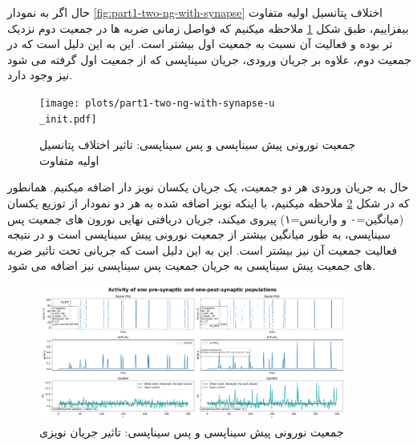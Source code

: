         حال اگر به نمودار 
        \ref{fig:part1-two-ng-with-synapse}
        اختلاف پتانسیل اولیه متفاوت بیفزاییم، طبق شکل 
        \ref{fig:part1-two-ng-with-synapse-u-init}
        ملاحظه میکنیم که فواصل زمانی ضربه ها در جمعیت دوم نزدیک تر بوده و فعالیت آن نسبت به جمعیت اول بیشتر است. این به این دلیل است که در جمعیت دوم، علاوه بر جریان ورودی، جریان سیناپسی که از جمعیت اول گرفته می شود نیز وجود دارد.
        \begin{figure}[!ht]
            \centering
            \texttt{[image: plots/part1-two-ng-with-synapse-u\\\_init.pdf]} 
            \caption{جمعیت نورونی پیش سیناپسی و پس سیناپسی: تاثیر اختلاف پتانسیل اولیه متفاوت}
            \label{fig:part1-two-ng-with-synapse-u-init}
        \end{figure}

        حال به جریان ورودی هر دو جمعیت، یک جریان یکسان نویز دار اضافه میکنیم. همانطور که در شکل
        \ref{fig:part1-two-ng-with-synapse-noise-curr}
        ملاحظه میکنیم، با اینکه نویز اضافه شده به هر دو نمودار از توزیع یکسان
        (میانگین=۰ و واریانس=۱)
        پیروی میکند، جریان دریافتی نهایی نورون های جمعیت پس سیناپسی، به طور میانگین بیشتر از جمعیت نورونی پیش سیناپسی است و در نتیجه فعالیت جمعیت آن نیز بیشتر است. این به این دلیل است که جریانی تحت تاثیر ضربه های جمعیت پیش سیناپسی به جریان جمعیت پس سیناپسی نیز اضافه می شود.
        \begin{figure}[!ht]
            \centering
            \includegraphics[width=0.9\textwidth]{plots/part1-two-ng-with-synapse-noise-curr.pdf} 
            \caption{جمعیت نورونی پیش سیناپسی و پس سیناپسی: تاثیر جریان نویزی}
            \label{fig:part1-two-ng-with-synapse-noise-curr}
        \end{figure}

